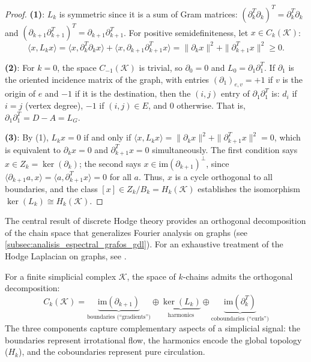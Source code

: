 \begin{proof}
	\textbf{(1)}: $L_k$ is symmetric since it is a sum of Gram matrices: $(\partial_k^T \partial_k)^T = \partial_k^T \partial_k$ and $(\partial_{k+1} \partial_{k+1}^T)^T = \partial_{k+1} \partial_{k+1}^T$. For positive semidefiniteness, let $x \in C_k(\mathcal{K})$:
	\[
		\langle x, L_k x \rangle = \langle x, \partial_k^T \partial_k x \rangle + \langle x, \partial_{k+1} \partial_{k+1}^T x \rangle = \|\partial_k x\|^2 + \|\partial_{k+1}^T x\|^2 \geq 0.
	\]

	\textbf{(2)}: For $k = 0$, the space $C_{-1}(\mathcal{K})$ is trivial, so $\partial_0 = 0$ and $L_0 = \partial_1 \partial_1^T$. If $\partial_1$ is the oriented incidence matrix of the graph, with entries $(\partial_1)_{e,v} = +1$ if $v$ is the origin of $e$ and $-1$ if it is the destination, then the $(i,j)$ entry of $\partial_1 \partial_1^T$ is: $d_i$ if $i = j$ (vertex degree), $-1$ if $(i,j) \in E$, and $0$ otherwise. That is, $\partial_1 \partial_1^T = D - A = L_G$.

	\textbf{(3)}: By (1), $L_k x = 0$ if and only if $\langle x, L_k x \rangle = \|\partial_k x\|^2 + \|\partial_{k+1}^T x\|^2 = 0$, which is equivalent to $\partial_k x = 0$ and $\partial_{k+1}^T x = 0$ simultaneously. The first condition says $x \in Z_k = \ker(\partial_k)$; the second says $x \in \mathrm{im}(\partial_{k+1})^\perp$, since $\langle \partial_{k+1} a, x \rangle = \langle a, \partial_{k+1}^T x \rangle = 0$ for all $a$. Thus, $x$ is a cycle orthogonal to all boundaries, and the class $[x] \in Z_k / B_k = H_k(\mathcal{K})$ establishes the isomorphism $\ker(L_k) \cong H_k(\mathcal{K})$.
\end{proof}

The central result of discrete Hodge theory provides an orthogonal decomposition of the chain space that generalizes Fourier analysis on graphs (see \autoref{subsec:analisis_espectral_grafos_gdl}). For an exhaustive treatment of the Hodge Laplacian on graphs, see \citet{lim2020hodge}.

\begin{theorem}\label{thm:hodge_decomposition_gdl}
	For a finite simplicial complex $\mathcal{K}$, the space of $k$-chains admits the orthogonal decomposition:
	\[
		C_k(\mathcal{K}) = \underbrace{\mathrm{im}(\partial_{k+1})}_{\text{boundaries (``gradients'')}} \oplus \underbrace{\ker(L_k)}_{\text{harmonics}} \oplus \underbrace{\mathrm{im}(\partial_k^T)}_{\text{coboundaries (``curls'')}}
	\]
	The three components capture complementary aspects of a simplicial signal: the boundaries represent irrotational flow, the harmonics encode the global topology ($H_k$), and the coboundaries represent pure circulation.
\end{theorem}

